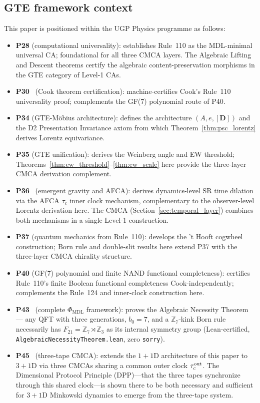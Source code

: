 \documentclass[11pt]{article}
\theoremstyle{remark}
\newcommand{\PHIMDL}{\Phi_{\mathrm{MDL}}}
\newcommand{\ZS}{\mathbb{Z}_7}
\newcommand{\ZZ}{\mathbb{Z}}
\newcommand{\lean}[1]{%
  \penalty-100
  \begingroup\def\_{\textunderscore\allowbreak}\texttt{#1}\endgroup}
\begin{document}
\subsection{GTE framework context}
\label{ssec:gte_context}

This paper is positioned within the UGP Physics programme
as follows:

\begin{itemize}[noitemsep]
  \item \textbf{P28} (computational universality): establishes Rule~110 as
    the MDL-minimal universal CA; foundational for all three CMCA layers.
    The Algebraic Lifting and Descent theorems certify the algebraic
    content-preservation morphisms in the GTE category of Level-1 CAs.
  \item \textbf{P30}~\cite{SpivackCookTheorem} (Cook theorem certification):
    machine-certifies Cook's Rule~110 universality proof; complements the
    GF(7) polynomial route of P40.
  \item \textbf{P34} (GTE-M\"obius architecture): defines the architecture
    $(A,e,[\mathbf{D}])$ and the D2 Presentation Invariance axiom from
    which Theorem~\ref{thm:psc_lorentz} derives Lorentz equivariance.
  \item \textbf{P35} (GTE unification): derives the Weinberg angle and EW
    threshold; Theorems~\ref{thm:ew_threshold}--\ref{thm:ew_scale} here
    provide the three-layer CMCA derivation complement.
  \item \textbf{P36}~\cite{SpivackEmergentGravity} (emergent gravity and AFCA):
    derives dynamics-level SR time dilation via the AFCA $\tau_c$ inner clock
    mechanism, complementary to the observer-level Lorentz derivation here.
    The CMCA (Section~\ref{sec:temporal_layer}) combines both mechanisms in
    a single Level-1 construction.
  \item \textbf{P37} (quantum mechanics from Rule~110): develops the 't Hooft
    cogwheel construction; Born rule and double-slit results here extend P37
    with the three-layer CMCA chirality structure.
  \item \textbf{P40} (GF(7) polynomial and finite NAND functional completeness):
    certifies Rule~110's finite Boolean functional completeness Cook-independently;
    complements the Rule~124 and inner-clock construction here.
  \item \textbf{P43}~\cite{SpivackCompleteness} (complete $\PHIMDL$ framework):
    proves the Algebraic Necessity Theorem --- any QFT with three generations,
    $b_0=7$, and a $\ZS$-kink Born rule necessarily has
    $F_{21} = \ZS\rtimes\ZZ_3$ as its internal symmetry group (Lean-certified,
    \lean{AlgebraicNecessityTheorem.lean}, zero \texttt{sorry}).
  \item \textbf{P45}~\cite{SpivackThreeTapeCMCA} (three-tape CMCA): extends
    the $1+1$D architecture of this paper to $3+1$D via three CMCAs sharing a
    common outer clock $\tau_c^{\rm out}$.  The Dimensional Protocol Principle
    (DPP)---that the three tapes synchronize through this shared clock---is
    shown there to be both necessary and sufficient for $3+1$D Minkowski
    dynamics to emerge from the three-tape system.
\end{itemize}
\end{document}
